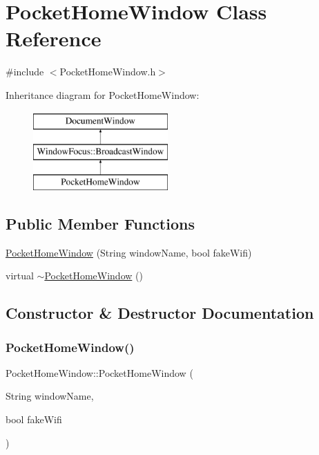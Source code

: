 \hypertarget{classPocketHomeWindow}{}\section{Pocket\+Home\+Window Class Reference}
\label{classPocketHomeWindow}


{\ttfamily \#include $<$Pocket\+Home\+Window.\+h$>$}

Inheritance diagram for Pocket\+Home\+Window\+:\begin{figure}[H]
\begin{center}
\leavevmode
\includegraphics[height=3.000000cm]{classPocketHomeWindow}
\end{center}
\end{figure}
\subsection*{Public Member Functions}
\begin{DoxyCompactItemize}
\item 
\mbox{\hyperlink{classPocketHomeWindow_a4a48881f66786d3ef02785113cbafa5e}{Pocket\+Home\+Window}} (String window\+Name, bool fake\+Wifi)
\item 
virtual \mbox{\hyperlink{classPocketHomeWindow_a861fd19e657471db01b7886d14e2b8d4}{$\sim$\+Pocket\+Home\+Window}} ()
\end{DoxyCompactItemize}


\subsection{Constructor \& Destructor Documentation}
\mbox{\label{classPocketHomeWindow_a4a48881f66786d3ef02785113cbafa5e}} 
\subsubsection{\texorpdfstring{Pocket\+Home\+Window()}{PocketHomeWindow()}}
{\footnotesize\ttfamily Pocket\+Home\+Window\+::\+Pocket\+Home\+Window (\begin{DoxyParamCaption}\item[{String}]{window\+Name,  }\item[{bool}]{fake\+Wifi }\end{DoxyParamCaption})}


